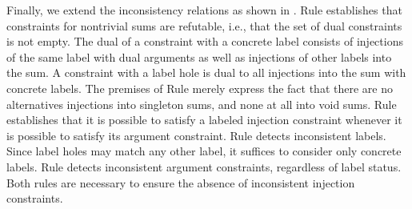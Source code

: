 

Finally, we extend the inconsistency relations as shown in .
Rule \RInjMult establishes that constraints for nontrivial sums are refutable, i.e., that the set of dual constraints is not empty.
The dual of a constraint with a concrete label consists of injections of the same label with dual arguments as well as injections of other labels into the sum.
A constraint with a label hole is dual to all injections into the sum with concrete labels.
The premises of Rule \RInjSing merely express the fact that there are no alternatives injections into singleton sums, and none at all into void sums.
Rule \PTInj establishes that it is possible to satisfy a labeled injection constraint whenever it is possible to satisfy its argument constraint.
Rule \CINCInjTag detects inconsistent labels.
Since label holes may match any other label, it suffices to consider only concrete labels.
Rule \CINCInjArg detects inconsistent argument constraints, regardless of label status.
Both rules are necessary to ensure the absence of inconsistent injection constraints.

